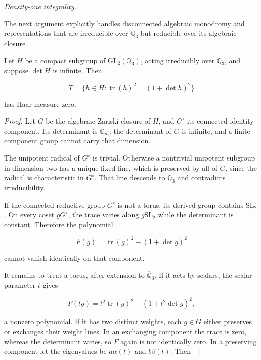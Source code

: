 \par\medskip\noindent\textit{Density-one integrality.}\quad 

The next argument explicitly handles disconnected algebraic monodromy
and representations that are irreducible over \(\mathbb Q_3\) but
reducible over its algebraic closure.

\begin{lemma}\label{lem:frey-three-trace-density} Let \(H\) be a compact subgroup of
\(\mathrm{GL}_2(\mathbb Q_3)\), acting irreducibly over \(\mathbb Q_3\),
and suppose \(\det H\) is infinite. Then

\[
T=\{h\in H:\operatorname{tr}(h)^2=(1+\det h)^2\}
\]

has Haar measure zero.

\end{lemma}\begin{proof} Let \(G\) be the algebraic Zariski closure of \(H\), and
\(G^\circ\) its connected identity component. Its determinant is
\(\mathbb G_m\): the determinant of \(G\) is infinite, and a finite
component group cannot carry that dimension.

The unipotent radical of \(G^\circ\) is trivial. Otherwise a nontrivial
unipotent subgroup in dimension two has a unique fixed line, which is
preserved by all of \(G\), since the radical is characteristic in
\(G^\circ\). That line descends to \(\mathbb Q_3\) and contradicts
irreducibility.

If the connected reductive group \(G^\circ\) is not a torus, its derived
group contains \(\mathrm{SL}_2\). On every coset \(gG^\circ\), the trace
varies along \(g\mathrm{SL}_2\) while the determinant is constant.
Therefore the polynomial

\[
F(g)=\operatorname{tr}(g)^2-(1+\det g)^2
\]

cannot vanish identically on that component.

It remains to treat a torus, after extension to
\(\overline{\mathbb Q}_3\). If it acts by scalars, the scalar parameter
\(t\) gives

\[
F(tg)=t^2\operatorname{tr}(g)^2-(1+t^2\det g)^2,
\]

a nonzero polynomial. If it has two distinct weights, each \(g\in G\)
either preserves or exchanges their weight lines. In an exchanging
component the trace is zero, whereas the determinant varies, so \(F\)
again is not identically zero. In a preserving component let the
eigenvalues be \(a\alpha(t)\) and \(b\beta(t)\). Then


\end{proof}
